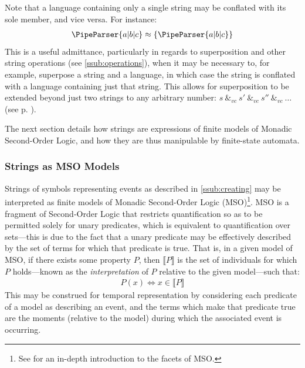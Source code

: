 \documentclass[a4paper,12pt,leqno]{article}
\newcommand{\vph}[1]{\vphantom{#1}}
\newcommand{\ebox}[1]{\fbox{$\vph{'(),}#1$}}
\newcommand{\spvc}{~\&_{v\!c}~}
\newcommand{\EventString}[1]{%
	\renewcommand*{\do}[1]{\ebox{##1}}%
	\PipeParser{#1}%
}
\begin{document}
Note that a language containing only a single string may be conflated with its sole member, and vice versa. For instance:
\begin{align}
	\EventString{a|b|c} \approx \{\EventString{a|b|c}\}
\end{align}
This is a useful admittance, particularly in regards to superposition and other string operations (see \cref{ssub:operations}), when it may be necessary to, for example, superpose a string and a language, in which case the string is conflated with a language containing just that string. This allows for superposition to be extended beyond just two strings to any arbitrary number: $s \spvc s' \spvc s'' \spvc \ldots$ (see p. \pageref{def:vc-superposition}).\label{pt:conflation}

The next section details how strings are expressions of finite models of Monadic Second-Order Logic, and how they are thus manipulable by finite-state automata.


\subsubsection{Strings as MSO Models}\label{ssub:mso}

Strings of symbols representing events as described in \cref{ssub:creating} may be interpreted as finite models of Monadic Second-Order Logic (MSO)\footnote{See \citet[ch. 7]{Libkin2004} for an in-depth introduction to the facets of MSO.}. MSO is a fragment of Second-Order Logic that restricts quantification so as to be permitted solely for unary predicates, which is equivalent to quantification over sets---this is due to the fact that a unary predicate may be effectively described by the set of terms for which that predicate is true. That is, in a given model of MSO, if there exists some property $P$, then $\llbracket P \rrbracket$ is the set of individuals for which $P$ holds---known as the \textit{interpretation} of $P$ relative to the given model---such that:
\begin{align}\label{impl:prop-interpretation}
	P(x) \Longleftrightarrow x \in \llbracket P \rrbracket
\end{align}
This may be construed for temporal representation by considering each predicate of a model as describing an event, and the terms which make that predicate true are the moments (relative to the model) during which the associated event is occurring.
\end{document}
